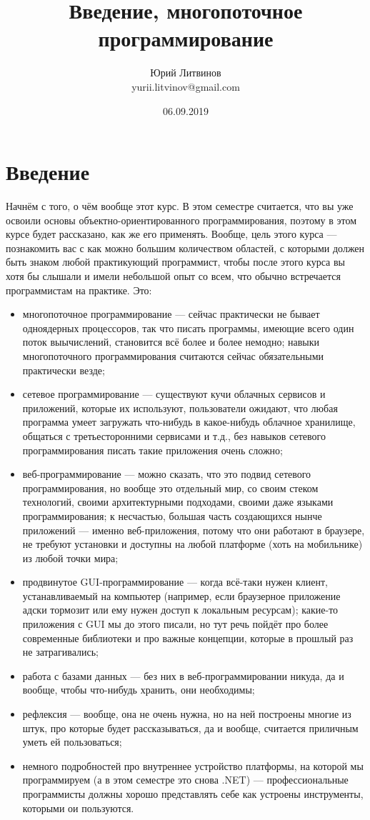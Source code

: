 \documentclass[a5paper]{article}
\title{Введение, многопоточное программирование}
\author{Юрий Литвинов\\\small{yurii.litvinov@gmail.com}}
\date{06.09.2019}
\begin{document}
\maketitle
\thispagestyle{empty}

\section{Введение}

Начнём с того, о чём вообще этот курс. В этом семестре считается, что вы уже освоили основы объектно-ориентированного программирования, поэтому в этом курсе будет рассказано, как же его применять. Вообще, цель этого курса --- познакомить вас с как можно большим количеством областей, с которыми должен быть знаком любой практикующий программист, чтобы после этого курса вы хотя бы слышали и имели небольшой опыт со всем, что обычно встречается программистам на практике. Это:

\begin{itemize}
	\item многопоточное программирование --- сейчас практически не бывает одноядерных процессоров, так что писать программы, имеющие всего один поток выычислений, становится всё более и более немодно; навыки многопоточного программирования считаются сейчас обязательными практически везде;
	\item сетевое программирование --- существуют кучи облачных сервисов и приложений, которые их используют, пользователи ожидают, что любая программа умеет загружать что-нибудь в какое-нибудь облачное хранилище, общаться с третьесторонними сервисами и т.д., без навыков сетевого программирования писать такие приложения очень сложно;
	\item веб-программирование --- можно сказать, что это подвид сетевого программирования, но вообще это отдельный мир, со своим стеком технологий, своими архитектурными подходами, своими даже языками программирования; к несчастью, большая часть создающихся нынче приложений --- именно веб-приложения, потому что они работают в браузере, не требуют установки и доступны на любой платформе (хоть на мобильнике) из любой точки мира;
	\item продвинутое GUI-программирование --- когда всё-таки нужен клиент, устанавливаемый на компьютер (например, если браузерное приложение адски тормозит или ему нужен доступ к локальным ресурсам); какие-то приложения с GUI мы до этого писали, но тут речь пойдёт про более современные библиотеки и про важные концепции, которые в прошлый раз не затрагивались;
	\item работа с базами данных --- без них в веб-программировании никуда, да и вообще, чтобы что-нибудь хранить, они необходимы;
	\item рефлексия --- вообще, она не очень нужна, но на ней построены многие из штук, про которые будет рассказываться, да и вообще, считается приличным уметь ей пользоваться;
	\item немного подробностей про внутреннее устройство платформы, на которой мы программируем (а в этом семестре это снова .NET) --- профессиональные программисты должны хорошо представлять себе как устроены инструменты, которыми ои пользуются.
\end{itemize}
\end{document}
